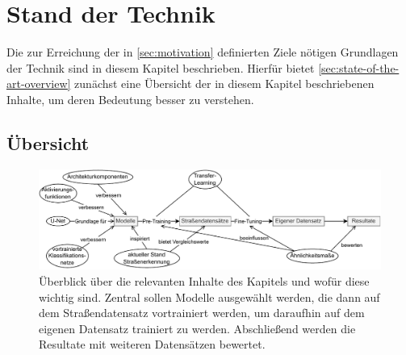 
\chapter{Stand der Technik}

Die zur Erreichung der in \autoref{sec:motivation} definierten Ziele nötigen Grundlagen der Technik sind 
in diesem Kapitel beschrieben. Hierfür bietet \autoref{sec:state-of-the-art-overview}
\textit{}
zunächst eine Übersicht der in diesem Kapitel beschriebenen Inhalte, um deren Bedeutung besser zu verstehen. 

\section{Übersicht} \label{sec:state-of-the-art-overview}

\begin{figure}[h]
	\centering
	\includegraphics[width=1.\textwidth]{Bilder/overview-background.drawio.pdf} 
	\caption{Überblick über die relevanten Inhalte des Kapitels und wofür diese wichtig sind. Zentral sollen Modelle 
	ausgewählt werden, die dann auf dem Straßendatensatz vortrainiert werden, um daraufhin 
	auf dem eigenen Datensatz trainiert zu werden. Abschließend werden die Resultate mit weiteren Datensätzen bewertet.}
	\label{fig:overview-background}
\end{figure} 

